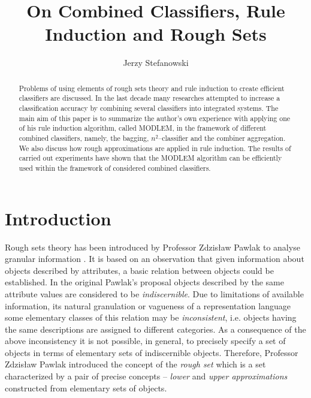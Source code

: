 \documentclass{llncs}
\begin{document}
\title{On Combined Classifiers, Rule Induction and Rough Sets}


\author{Jerzy Stefanowski}






\maketitle

\begin{abstract}
Problems of using elements of rough sets theory and rule induction to create
efficient classifiers are discussed. In the last decade many researches
attempted to increase a classification accuracy by combining several
classifiers into integrated systems. The main aim of this paper is to
summarize the author's own experience with applying one of his rule
induction algorithm, called MODLEM, in the framework of different combined
classifiers, namely, the bagging, $n^2$--classifier and the combiner
aggregation. We also discuss how rough approximations are applied in rule
induction. The results of carried out experiments have shown that the MODLEM
algorithm can be efficiently used within the framework of considered
combined classifiers.
\end{abstract}

\section{Introduction}


Rough sets theory has been introduced by Professor Zdzis{\l}aw Pawlak to
analyse granular information \cite{pawlak82,pawlak91}.  It is based on an
observation that given information about objects described by attributes, a
basic relation between objects could be established. In the original
Pawlak's proposal \cite{pawlak82} objects described by the same attribute
values are considered to be {\em indiscernible}. Due to limitations of
available information, its natural granulation or vagueness of a
representation language some elementary classes of this relation may be {\em
inconsistent}, i.e. objects having the same descriptions are assigned to
different categories. As a consequence of the above inconsistency it is not
possible, in general, to precisely specify a set of objects in terms of
elementary sets of indiscernible objects. Therefore, Professor Zdzis{\l}aw
Pawlak introduced the concept of the {\em rough set} which is a set
characterized by a pair of precise concepts -- {\em lower} and {\em upper
approximations} constructed from elementary sets of objects.
\end{document}
